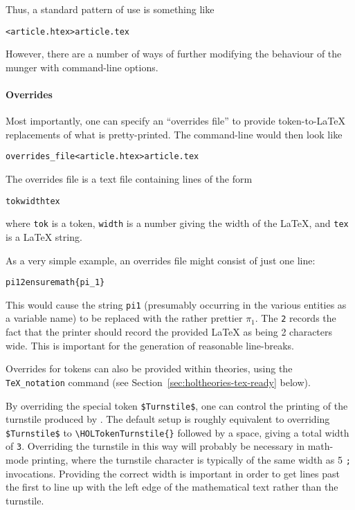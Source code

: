 Thus, a standard pattern of use is something like
\begin{alltt}
   \munge < article.htex > article.tex
\end{alltt}

However, there are a number of ways of further modifying the behaviour of the munger with command-line options.

\paragraph{Overrides}
Most importantly, one can specify an ``overrides file'' to provide
token-to-\LaTeX{} replacements of what is pretty-printed.
%
The command-line would then look like
\begin{alltt}
   \munge overrides_file < article.htex > article.tex
\end{alltt}
The overrides file is a text file containing lines of the form
\begin{alltt}
   tok width tex
\end{alltt}
where \texttt{tok} is a \HOL{} token, \texttt{width} is a number
giving the width of the \LaTeX{}, and \texttt{tex} is a \LaTeX{}
string.

As a very simple example, an overrides file might consist of just one
line:
\begin{alltt}
   pi1 2 \bs{}ensuremath\{\bs{}pi_1\}
\end{alltt}
This would cause the string \texttt{pi1} (presumably occurring in the
various \HOL{} entities as a variable name) to be replaced with the
rather prettier $\pi_1$.
%
The \texttt{2} records the fact that the
printer should record the provided \LaTeX{} as being 2 characters
wide.
%
This is important for the generation of reasonable line-breaks.

Overrides for \HOL{} tokens can also be provided within \HOL{}
theories, using the
\texttt{TeX\_notation} command (see
Section~\ref{sec:holtheories-tex-ready} below).

By overriding the special token \texttt{\$Turnstile\$}, one can control the printing of the turnstile produced by \holthm{}.
The default setup is roughly equivalent to overriding \texttt{\$Turnstile\$} to \texttt{\textbackslash{}HOLTokenTurnstile\{\}} followed by a space, giving a total width of \texttt{3}.
Overriding the turnstile in this way will probably be necessary in math-mode printing, where the turnstile character is typically of the same width as 5 \texttt{\bs;} invocations.
Providing the correct width is important in order to get lines past the first to line up with the left edge of the mathematical text rather than the turnstile.

